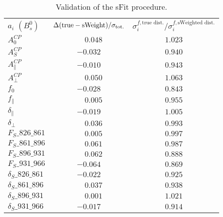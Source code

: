 \begin{table}[b!]
\begin{center}
\caption[Validation of the sFit procedure]{\label{tab:sFitValidation} Validation of the sFit procedure.}
\vspace{5pt}
\begin{tabular}{l|c|c}
 \multirow{2}{*}{$a_i$ $(B^0_s)$} & \multirow{2}{*}{$\Delta(\textrm{true} - \textrm{sWeight}) /\sigma_{\rm tot.} $} & \multirow{2}{*}{$\sigma_i^{f,\textrm{true dist.}} / \sigma_i^{f,\textrm{sWeighted dist.}}  $} \\
					       &	 					  &			\\	
\hline

$A^{C\!P}_0$ 	&$	\phantom{-}0.048	$&$	1.023	 $\\
$A^{C\!P}_S$ 	&$	-0.032	$&$	0.940	 $\\
$A^{C\!P}_{\|}$ 	&$	-0.010	$&$	0.943	 $\\
$A^{C\!P}_{\perp}$ 	&$	\phantom{-}0.050	$&$	1.063	 $\\
					
\hline					
					
$f_0$	&$	-0.028	$&$	0.843	 $\\
$f_{\|}$	&$	\phantom{-}0.005	$&$	0.955	 $\\
$\delta_{\|}$	&$	-0.019	$&$	1.005	 $\\
$\delta_{\perp}$	&$	\phantom{-}0.036	$&$	0.993	 $\\
					
\hline					
					
$F_S\_826\_861 $	&$	\phantom{-}0.005	$&$	0.997	 $\\
$F_S\_861\_896  $	&$	\phantom{-}0.061	$&$	0.987	 $\\
$F_S\_896\_931  $	&$	\phantom{-}0.062	$&$	0.888	 $\\
$F_S\_931\_966  $	&$	-0.064	$&$	0.869	 $\\
$\delta_S\_826\_861$ 	&$	-0.022	$&$	0.925	 $\\
$\delta_S\_861\_896 $	&$	\phantom{-}0.037	$&$	0.938	 $\\
$\delta_S\_896\_931 $	&$	\phantom{-}0.001	$&$	1.021	 $\\
$\delta_S\_931\_966 $	&$	-0.017	$&$	0.914	 $\\


 \end{tabular}
\vspace{-20pt}
\end{center}
\end{table}
\clearpage
